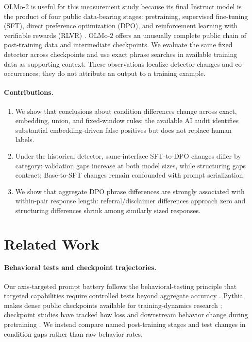 \documentclass[11pt]{article}
\begin{document}
OLMo-2 is useful for this measurement study because its final Instruct model is
the product of four public data-bearing stages:
pretraining, supervised fine-tuning (SFT), direct preference optimization
(DPO), and reinforcement learning with verifiable rewards (RLVR)
\citep{olmo2025olmo2}. OLMo-2 offers an unusually complete public chain of
post-training data and intermediate checkpoints. We evaluate the same fixed
detector across checkpoints and use exact phrase searches in available training
data as supporting context. These observations localize detector changes and
co-occurrences; they do not attribute an output to a training example.

\paragraph{Contributions.}
\begin{enumerate}\itemsep2pt
\item We show that conclusions about condition differences change across exact,
embedding, union, and fixed-window rules; the available AI audit identifies
substantial embedding-driven false positives but does not replace human labels.
\item Under the historical detector, same-interface SFT-to-DPO changes differ
by category: validation gaps increase at both model sizes, while structuring
gaps contract; Base-to-SFT changes remain confounded with prompt serialization.
\item We show that aggregate DPO phrase differences are strongly associated
with within-pair response length: referral/disclaimer differences approach zero
and structuring differences shrink among similarly sized responses.
\end{enumerate}

\section{Related Work}

\paragraph{Behavioral tests and checkpoint trajectories.}
Our axis-targeted prompt battery follows the behavioral-testing principle that
targeted capabilities require controlled tests beyond aggregate accuracy
\citep{ribeiro2020checklist}. Pythia makes dense public checkpoints available
for training-dynamics research \citep{biderman2023pythia}; checkpoint studies
have tracked how loss and downstream behavior change during pretraining
\citep{xia2023trajectories}. We instead compare named post-training stages and
test changes in condition gaps rather than raw behavior rates.
\end{document}
